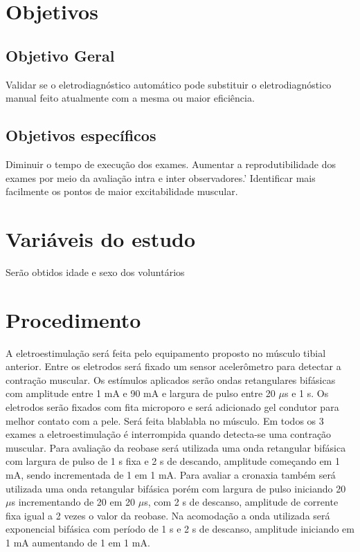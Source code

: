 \documentclass[a4paper,10pt]{article}
\title{}
\author{}
\date{}
\begin{document}
\maketitle

\section{Objetivos}

\subsection{Objetivo Geral}
Validar se o eletrodiagnóstico automático pode substituir o eletrodiagnóstico manual feito atualmente com a mesma ou maior eficiência.
\subsection{Objetivos específicos}
Diminuir o tempo de execução dos exames.
Aumentar a reprodutibilidade dos exames por meio da avaliação intra e inter observadores.’
Identificar mais facilmente os pontos de maior excitabilidade muscular.

\section{Variáveis do estudo}
Serão obtidos idade e sexo dos voluntários

\section{Procedimento}
A eletroestimulação será feita pelo equipamento proposto no músculo tibial anterior. Entre os eletrodos será fixado um sensor acelerômetro para detectar a contração muscular. Os estímulos aplicados serão ondas retangulares bifásicas com amplitude entre 1 mA e 90 mA e largura de pulso entre 20 $\mu$s e 1 s. Os eletrodos serão fixados com fita microporo e será adicionado gel condutor para melhor contato com a pele. Será feita blablabla  no músculo.
Em todos os 3 exames a eletroestimulação é interrompida quando detecta-se uma contração muscular.
Para avaliação da reobase será utilizada uma onda retangular bifásica com largura de pulso de 1 s fixa e 2 s de descando, amplitude começando em 1 mA, sendo incrementada de 1 em 1 mA.
Para avaliar a cronaxia também será utilizada uma onda retangular bifásica porém com largura de pulso iniciando 20 $\mu$s incrementando de 20 em 20 $\mu$s, com 2 s de descanso, amplitude de corrente fixa igual a 2 vezes o valor da reobase.
Na acomodação a onda utilizada será exponencial bifásica com período de 1 s e 2 s de descanso, amplitude iniciando em 1 mA aumentando de 1 em 1 mA.
\end{document}
